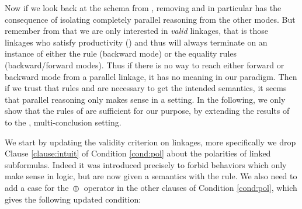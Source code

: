 Now if we look back at the schema from , removing
{} and {} in particular has the consequence
of isolating completely parallel reasoning from the other modes. But remember
from  that we are only interested in \emph{valid} linkages, that
is those linkages who satisfy productivity () and thus will
always terminate on an instance of either the {} rule (backward mode)
or the equality rules (backward/forward modes). Thus if there is no way to reach
either forward or backward mode from a parallel linkage, it has no meaning in
our paradigm. Then if we trust that rules {} and
{} are necessary to get the intended semantics, it seems that
parallel reasoning only makes sense in a  setting. In the following, we
only show that the rules of  are sufficient for our purpose, by
extending the results of  to the , multi-conclusion setting.

We start by updating the validity criterion on linkages, more specifically we
drop Clause \ref{clause:intuit} of Condition \ref{cond:pol} about the polarities
of linked subformulas. Indeed it was introduced precisely to forbid behaviors
which only make sense in  logic, but are now given a semantics with the
{} rule. We also need to add a case for the $\operatorname{\,\varobar\,}$ operator
in the other clauses of Condition \ref{cond:pol}, which gives the following
updated condition:

